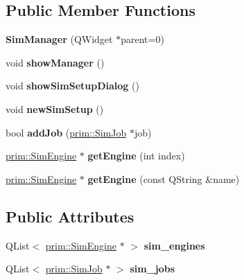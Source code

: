 \subsection*{Public Member Functions}
\begin{DoxyCompactItemize}
\item 
{\bfseries Sim\+Manager} (Q\+Widget $\ast$parent=0)\hypertarget{classgui_1_1SimManager_a96397fcb5cba29e45486de8d3df780a8}{}\label{classgui_1_1SimManager_a96397fcb5cba29e45486de8d3df780a8}

\item 
void {\bfseries show\+Manager} ()\hypertarget{classgui_1_1SimManager_ac770eb6898dcb0bf44ce2e7eb507bcf6}{}\label{classgui_1_1SimManager_ac770eb6898dcb0bf44ce2e7eb507bcf6}

\item 
void {\bfseries show\+Sim\+Setup\+Dialog} ()\hypertarget{classgui_1_1SimManager_a21561cf49ee70f6c65f8eb9daa7d8e08}{}\label{classgui_1_1SimManager_a21561cf49ee70f6c65f8eb9daa7d8e08}

\item 
void {\bfseries new\+Sim\+Setup} ()\hypertarget{classgui_1_1SimManager_accf932766603bc17addaac7f525ce3e2}{}\label{classgui_1_1SimManager_accf932766603bc17addaac7f525ce3e2}

\item 
bool {\bfseries add\+Job} (\hyperlink{classprim_1_1SimJob}{prim\+::\+Sim\+Job} $\ast$job)\hypertarget{classgui_1_1SimManager_ae1f3f32e01556aa2279737f4696683c1}{}\label{classgui_1_1SimManager_ae1f3f32e01556aa2279737f4696683c1}

\item 
\hyperlink{classprim_1_1SimEngine}{prim\+::\+Sim\+Engine} $\ast$ {\bfseries get\+Engine} (int index)\hypertarget{classgui_1_1SimManager_af231d59281e29eda8cf4b2c6843320ac}{}\label{classgui_1_1SimManager_af231d59281e29eda8cf4b2c6843320ac}

\item 
\hyperlink{classprim_1_1SimEngine}{prim\+::\+Sim\+Engine} $\ast$ {\bfseries get\+Engine} (const Q\+String \&name)\hypertarget{classgui_1_1SimManager_ad6ad66bf7d785193fdc7acdb796eba35}{}\label{classgui_1_1SimManager_ad6ad66bf7d785193fdc7acdb796eba35}

\end{DoxyCompactItemize}
\subsection*{Public Attributes}
\begin{DoxyCompactItemize}
\item 
Q\+List$<$ \hyperlink{classprim_1_1SimEngine}{prim\+::\+Sim\+Engine} $\ast$ $>$ {\bfseries sim\+\_\+engines}\hypertarget{classgui_1_1SimManager_a679f345fcdb17475451915d543d62c5b}{}\label{classgui_1_1SimManager_a679f345fcdb17475451915d543d62c5b}

\item 
Q\+List$<$ \hyperlink{classprim_1_1SimJob}{prim\+::\+Sim\+Job} $\ast$ $>$ {\bfseries sim\+\_\+jobs}\hypertarget{classgui_1_1SimManager_a075fa8ea0e4f853b1e6835369cf68000}{}\label{classgui_1_1SimManager_a075fa8ea0e4f853b1e6835369cf68000}

\end{DoxyCompactItemize}


